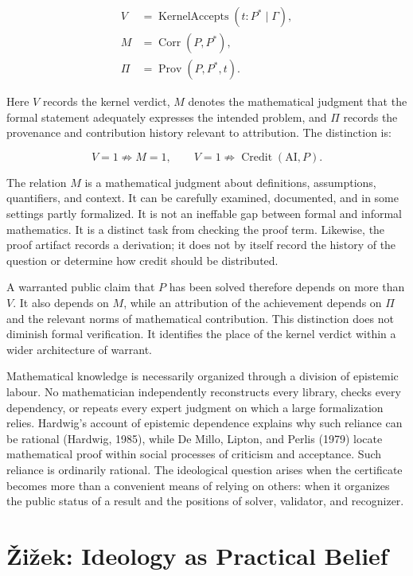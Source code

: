 \documentclass[pdflatex,sn-apa]{sn-jnl}
\begin{document}
\[
\begin{aligned}
V&=\operatorname{KernelAccepts}(t:P^*\mid\Gamma),\\
M&=\operatorname{Corr}(P,P^*),\\
\Pi&=\operatorname{Prov}(P,P^*,t).
\end{aligned}
\]

Here \(V\) records the kernel verdict, \(M\) denotes the mathematical judgment that the formal statement adequately expresses the intended problem, and \(\Pi\) records the provenance and contribution history relevant to attribution. The distinction is:

\[
V=1\not\Rightarrow M=1,
\qquad
V=1\not\Rightarrow \operatorname{Credit}(\mathrm{AI},P).
\]

The relation \(M\) is a mathematical judgment about definitions, assumptions, quantifiers, and context. It can be carefully examined, documented, and in some settings partly formalized. It is not an ineffable gap between formal and informal mathematics. It is a distinct task from checking the proof term. Likewise, the proof artifact records a derivation; it does not by itself record the history of the question or determine how credit should be distributed.

A warranted public claim that \(P\) has been solved therefore depends on more than \(V\). It also depends on \(M\), while an attribution of the achievement depends on \(\Pi\) and the relevant norms of mathematical contribution. This distinction does not diminish formal verification. It identifies the place of the kernel verdict within a wider architecture of warrant.

Mathematical knowledge is necessarily organized through a division of epistemic labour. No mathematician independently reconstructs every library, checks every dependency, or repeats every expert judgment on which a large formalization relies. Hardwig's account of epistemic dependence explains why such reliance can be rational (Hardwig, 1985), while De Millo, Lipton, and Perlis (1979) locate mathematical proof within social processes of criticism and acceptance. Such reliance is ordinarily rational. The ideological question arises when the certificate becomes more than a convenient means of relying on others: when it organizes the public status of a result and the positions of solver, validator, and recognizer.
\section{Žižek: Ideology as Practical Belief}
\end{document}
